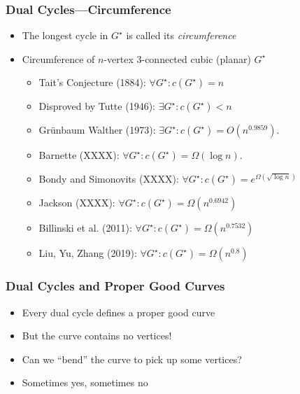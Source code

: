 \documentclass[xcolor=dvipsnames]{beamer}
\newcommand{\dual}[1]{#1^\star}
\begin{document}
\begin{frame}
   \frametitle{Dual Cycles---Circumference}

   \begin{itemize}[<+->]
      \item The longest cycle in $\dual{G}$ is called its \emph{circumference} 
      \item Circumference of $n$-vertex 3-connected cubic (planar) $\dual{G}$
      \begin{itemize}
        \item Tait's Conjecture (1884): $\forall \dual{G}: c(\dual{G}) = n$
        \item Disproved by Tutte (1946): $\exists \dual{G}: c(\dual{G})< n$
        \item Gr\"unbaum Walther (1973): $\exists \dual{G}: c(\dual{G}) = O(n^{0.9859})$.
        \item Barnette (XXXX): $\forall \dual{G}: c(\dual{G})=\Omega(\log n)$.
        \item Bondy and Simonovits (XXXX): $\forall \dual{G}: c(\dual{G})=e^{\Omega(\sqrt{\log n})}$
        \item Jackson (XXXX): $\forall \dual{G}: c(\dual{G}) = \Omega(n^{0.6942})$
        \item Billinski et al. (2011): $\forall \dual{G}: c(\dual{G}) = \Omega(n^{0.7532})$
        \item Liu, Yu, Zhang (2019): $\forall \dual{G}: c(\dual{G}) = \Omega(n^{0.8})$
      \end{itemize}
   \end{itemize}
\end{frame}

\begin{frame}
   \frametitle{Dual Cycles and Proper Good Curves}

   \begin{itemize}[<+->]
      \item Every dual cycle defines a proper good curve
      \item But the curve contains no vertices!
      \item Can we ``bend'' the curve to pick up some vertices?
      \item Sometimes yes, sometimes no
   \end{itemize}

\end{frame}
\end{document}
